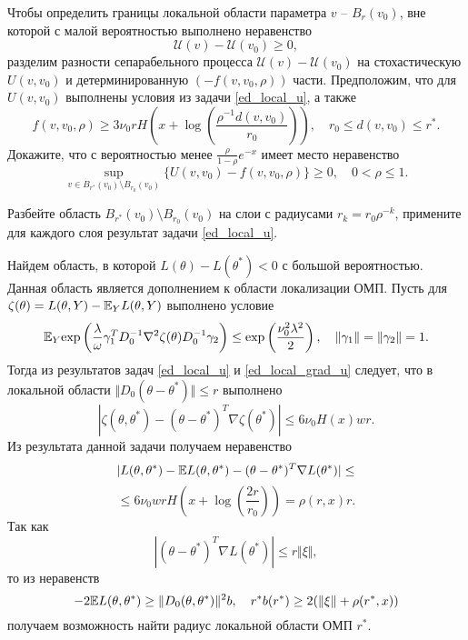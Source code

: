 \begin{problem}
Чтобы определить границы локальной области параметра $v$ -- $B_{r}(v_0)$, вне которой с малой вероятностью выполнено неравенство
\[
\mathcal{U}(v) - \mathcal{U}(v_0) \geq 0, 
\]
разделим разности сепарабельного процесса $\mathcal{U}(v) - \mathcal{U}(v_0)$ на стохастическую $U(v, v_0)$ и детерминированную $ (- f(v, v_0, \rho))$ части. Предположим, что для $U(v, v_0)$ выполнены условия из задачи \ref{ed_local_u}, а также 
\[
f(v, v_0, \rho) \geq 3 \nu_0 r H \left(x + \log \left( \frac{\rho^{-1} d(v, v_0)}{r_0} \right) \right),
\quad
r_0 \leq  d(v, v_0) \leq r^*.
\]
Докажите, что с вероятностью менее $\frac{\rho}{1-\rho} e^{-x}$ имеет место неравенство
\[
\sup_{v \in B_{r^*}(v_0) \setminus B_{r_0}(v_0)} \{ U(v, v_0) - f(v, v_0, \rho) \} \geq 0,
\quad
0 < \rho \leq 1.
\]
\end{problem}


\begin{ordre}
Разбейте область $B_{r^*}(v_0) \setminus B_{r_0}(v_0)$ на слои с радиусами $r_k = r_0 \rho^{-k}$, примените для каждого слоя результат задачи \ref{ed_local_u}.
\end{ordre}
\begin{remark}
Найдем область, в которой $L(\theta) - L(\theta^*) < 0$ с большой вероятностью. Данная область является дополнением к области локализации ОМП.  Пусть для 
$\zeta(\theta) = L(\theta, Y) - \mathrm{{\mathbb E}}_Y L(\theta, Y)$ выполнено условие
\[
\mathrm{{\mathbb E}}_Y \text{exp} \left( \frac{\lambda}{\omega} \gamma_1^{T} D_0^{-1} \nabla^2 \zeta(\theta) D_0^{-1} \gamma_2 \right) \leq \text{exp} \left( \frac{\nu_0^2 \lambda^2}{2}\right), 
\quad \Vert \gamma_1 \Vert = \Vert \gamma_2 \Vert = 1.
\]
Тогда из результатов задач \ref{ed_local_u} и \ref{ed_local_grad_u} следует, что в локальной области $\Vert D_0(\theta - \theta^*)\Vert \leq r$ выполнено
\[
 | \zeta(\theta, \theta^*) - (\theta - \theta^*)^T \nabla \zeta(\theta^*)  | \leq  6 \nu_0 H(x) w r.
\]
Из результата данной задачи получаем неравенство
\[
|L(\theta, \theta^*) - \mathrm{{\mathbb E}} L(\theta, \theta^*) - (\theta - \theta^*)^T \nabla L(\theta^*) |\leq
\]
\[
\leq 6 \nu_0  w r H \left(x + \log \left( \frac{2 r}{r_0} \right) \right) = 
\rho(r,x) r.
\]
Так как
\[
|(\theta - \theta^*)^T \nabla L(\theta^*) | \leq r \Vert \xi \Vert,
\]
то из неравенств
\[
-2 \mathrm{{\mathbb E}} L(\theta, \theta^*) \geq \Vert D_0(\theta, \theta^*) \Vert^2 b,
\quad
r^*  b(r^*) \geq 2 (\Vert \xi \Vert + \rho(r^*,x))
\]
получаем возможность найти радиус локальной области ОМП $r^*$.
\end{remark}

